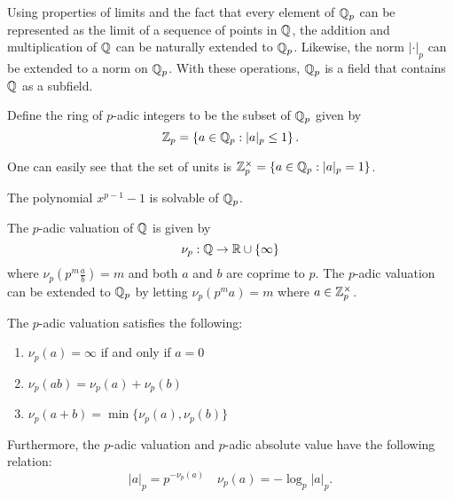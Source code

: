 Using properties of limits and the fact that every element of $\mathbb{Q}_p$ can be represented as the limit of a sequence of points in $\mathbb{Q}$, the addition and multiplication of $\mathbb{Q}$ can be naturally extended to $\mathbb{Q}_p$. Likewise, the norm $|\cdot|_p$ can be extended to a norm on $\mathbb{Q}_p$. With these operations, $\mathbb{Q}_p$ is a field that contains $\mathbb{Q}$ as a subfield.

\begin{definition}
    Define the ring of $p$-adic integers to be the subset of $\mathbb{Q}_p$ given by
        \[\mathbb{Z}_p = \left\{a \in \mathbb{Q}_p: |a|_p \leq 1\right\}.\]
\end{definition}

One can easily see that the set of units is $\mathbb{Z}_p^\times = \{a \in \mathbb{Q}_p: |a|_p =1 \}$.

\begin{example}
    The polynomial $x^{p-1} -1$ is solvable of $\mathbb{Q}_p$.
\end{example}

\begin{definition}
    The $p$-adic valuation of $\mathbb{Q}$ is given by
        \[\nu_p: \mathbb{Q} \to \mathbb{R} \cup \{\infty\} \]
    where $\nu_p(p^m\frac{a}{b}) = m$ and both $a$ and $b$ are coprime to $p$. The $p$-adic valuation can be extended to $\mathbb{Q}_p$ by letting $\nu_p(p^m a) = m$ where $a \in \mathbb{Z}_p^\times$. 
\end{definition}

\begin{proposition}
    The $p$-adic valuation satisfies the following:

    \begin{enumerate}
        \item $\nu_p(a) = \infty$ if and only if $a = 0$
        \item $\nu_p(ab) = \nu_p(a) + \nu_p(b)$
        \item $\nu_p(a+b) = \min\{\nu_p(a), \nu_p(b)\}$
    \end{enumerate}
    
    Furthermore, the $p$-adic valuation and $p$-adic absolute value have the following relation:
    \[|a|_p = p^{-\nu_p(a)} \quad \nu_p(a) = -\log_p|a|_p.\]
\end{proposition}


